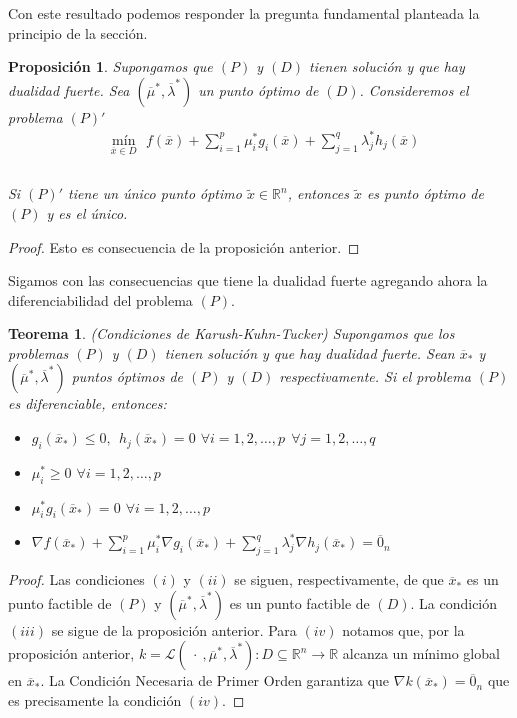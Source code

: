 \documentclass[11pt]{report}
\newtheorem{theorem}{Teorema}[section]
\newtheorem{proposition}{Proposición}[section]
\newcommand{\Rn}{\mathbb{R}^{n}}
\newcommand{\R}{\mathbb{R}}
\newcommand{\x}{\overline{x}}
\newcommand{\z}{\overline{0}_{n}}
\newcommand{\Sp}{1,2,\ldots, p}
\newcommand{\Sq}{1,2,\ldots, q}
\newcommand{\La}{\mathcal{L}}
\newcommand{\xo}{\overline{x}_{*}}
\newcommand{\muo}{\overline{\mu}^{*}}
\newcommand{\lao}{\overline{\lambda}^{*}}
\newcommand{\mlo}{(\overline{\mu}^{*},\overline{\lambda}^{*})}
\newcommand{\xc}{\widetilde{x}}
\begin{document}
\noindent
Con este resultado podemos responder la pregunta fundamental planteada la principio de la sección.
\begin{proposition}
Supongamos que $(P)$ y $(D)$ tienen solución y que hay dualidad fuerte. Sea $\mlo$ un punto óptimo de $(D)$. Consideremos el problema $(P)'$
\begin{equation*}
\begin{aligned}
& \underset{\x\in D}{\text{mín}}\ \ \ f(\x)+\sum_{i=1}^{p}\mu_{i}^{*} g_{i}(\x) + \sum_{j=1}^{q}\lambda_{j}^{*} h_{j}(\x) \\
\end{aligned}
\end{equation*}\\
Si $(P)'$ tiene un único punto óptimo $\xc\in\Rn$, entonces $\xc$ es punto óptimo de $(P)$ y es el único.
\end{proposition}
\begin{proof}
Esto es consecuencia de la proposición anterior.
\end{proof}

Sigamos con las consecuencias que tiene la dualidad fuerte agregando ahora la diferenciabilidad del problema $(P)$.
\begin{theorem}(Condiciones de Karush-Kuhn-Tucker)
Supongamos que los problemas $(P)$ y $(D)$ tienen solución y que hay dualidad fuerte.  Sean $\xo$ y $\mlo$ puntos óptimos de $(P)$ y $(D)$ respectivamente. Si el problema $(P)$ es diferenciable, entonces: %
\begin{itemize}
\item[(i)] $g_{i}(\xo)\leq0,\ \ h_{j}(\xo)=0$ $\forall i=\Sp\ \ \forall j=\Sq$
\item[(ii)] $\mu_{i}^{*}\geq0$ $\forall i=\Sp$
\item[(iii)] $\mu_{i}^{*}g_{i}(\xo)=0$ $\forall i=\Sp$
\item[(iv)] $\nabla f(\xo)+\sum_{i=1}^{p}\mu_{i}^{*}\nabla g_{i}(\xo) + \sum_{j=1}^{q}\lambda_{j}^{*}\nabla h_{j}(\xo)=\z$
\end{itemize}
\end{theorem}
\begin{proof}
Las condiciones $(i)$ y $(ii)$ se siguen, respectivamente, de que $\xo$ es un punto factible de $(P)$ y $\mlo$ es un punto factible de $(D)$. La condición $(iii)$ se sigue de la proposición anterior. Para $(iv)$ notamos que, por la proposición anterior, $k=\La(\ \cdot\ ,\muo, \lao):D\subseteq\Rn\rightarrow\R$ alcanza un mínimo global en $\xo$. La Condición Necesaria de Primer Orden garantiza que $\nabla k(\xo)=\z$ que es precisamente la condición $(iv)$.
\end{proof}
\end{document}
